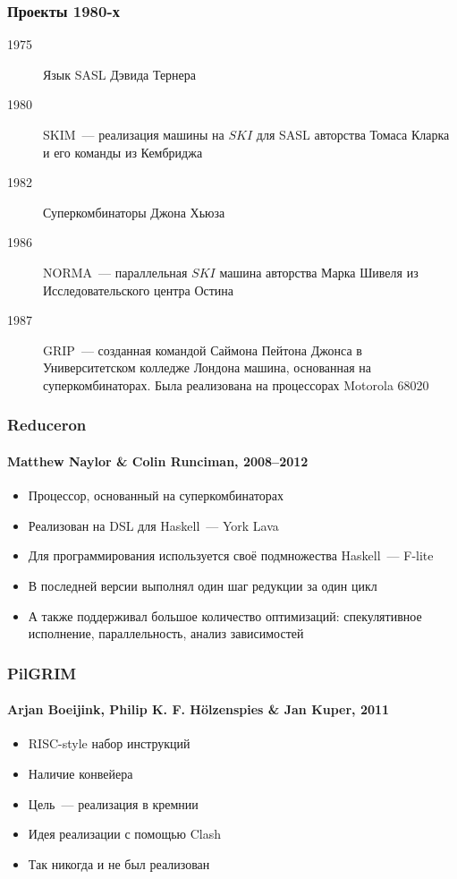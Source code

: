 \begin{frame}
    \frametitle{Проекты 1980-х}

    \begin{description}
        \item[1975] Язык SASL Дэвида Тернера
        \item[1980] SKIM~--- реализация машины на $SKI$ для SASL авторства Томаса Кларка и его команды из Кембриджа
        \item[1982] Суперкомбинаторы Джона Хьюза
        \item[1986] NORMA~--- параллельная $SKI$ машина авторства Марка Шивеля из Исследовательского центра Остина
        \item[1987] GRIP~--- созданная командой Саймона Пейтона Джонса в Университетском колледже Лондона машина, основанная на суперкомбинаторах.
              Была реализована на процессорах Motorola 68020
    \end{description}

\end{frame}

\begin{frame}
    \frametitle{Reduceron}
    \framesubtitle{Matthew Naylor \& Colin Runciman, 2008--2012}

    \begin{itemize}
        \item Процессор, основанный на суперкомбинаторах
        \item Реализован на DSL для Haskell~--- York Lava
        \item Для программирования используется своё подмножества Haskell~--- F-lite
        \item В последней версии выполнял один шаг редукции за один цикл
        \item А также поддерживал большое количество оптимизаций: спекулятивное исполнение, параллельность, анализ зависимостей
    \end{itemize}

\end{frame}

\begin{frame}
    \frametitle{PilGRIM}
    \framesubtitle{Arjan Boeijink, Philip K. F. Hölzenspies \& Jan Kuper, 2011}

    \begin{itemize}
        \item RISC-style набор инструкций
        \item Наличие конвейера
        \item Цель~--- реализация в кремнии
        \item Идея реализации с помощью Clash
        \item Так никогда и не был реализован
    \end{itemize}

\end{frame}

